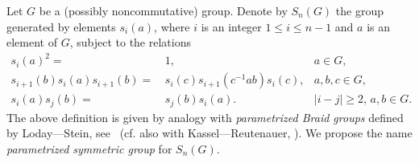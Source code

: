 \documentclass[oneside, 10pt]{amsart}
\makeatletter
\theoremstyle{plain}
\numberwithin{equation}{section}
\numberwithin{lemma}{section}
\theoremstyle{remark}
\theoremstyle{definition}
\newcommand{\pullbackcorner}[1][dr]{\save*!/#1-1.2pc/#1:(-1,1)@^{|-}\restore}
\makeatother
\begin{document}
\begin{comment}
Denote by $D_n(G)$ the subgroup of $G^n$ consisting of vectors
 $(g_1,\ldots, g_n)$ for which the product $g_1\cdot \ldots \cdot g_n$ lies in the derived subgroup $[G, G]$.
Recall from Rehmann's paper~\cite{Reh78} that the universal {\it extension of type $\mathfrak{H}_n$} (denoted $H_n(G)$) 
 is, by definition, a certain (central) extension of $D_n(G)$ explicitly presented by generators and relations 
 (see section~\ref{sec:Hnextensions} below).
The extension $H_n(G)$ and its ''antisymmetrization`` $H^\wedge_n(G)$ can be characterised by the property that 
 they fit into the following pullback squares:
\[ \xymatrix{ G \mathbin{\widetilde{\wedge}} G \pullbackcorner \ar@{^{(}->}[d] \ar@{->>}[r] & [G, G] \ar@{^{(}->}[d]^{\iota_1} \\ H_n(G) \ar@{->>}[r] & D_n(G)} \qquad
   \xymatrix{ G \wedge G \pullbackcorner \ar@{^{(}->}[d] \ar@{->>}[r] & [G, G] \ar@{^{(}->}[d]^{\iota_1} \\ H^\wedge_n(G) \ar@{->>}[r] & D_n(G)} \]
Here $G \wedge G$ denotes the nonabelian exterior square of $G$ and  
 $G \mathbin{\widetilde{\wedge}} G$ is the modern notation for the Dennis group $(G, G)$ defined in~\cite{De76} (also denoted $U_G$ by Rehmann in \cite{Reh78}).
The map $\iota_1$ in the above diagrams is defined by $\iota_1(g) = (g, 1,\ldots, 1)$.
\end{comment}
Let $G$ be a (possibly noncommutative) group. Denote by $S_n(G)$ the group generated by elements $s_i(a)$, where $i$ is an integer $1\leq i\leq n-1$ and $a$ is an element of $G$, subject to the relations
\begin{align}
s_i(a)^2 = &\, 1,                                    & a \in G, \label{S1} \tag{SnG1} \\
s_{i+1}(b) s_i(a) s_{i+1}(b) = &\, s_i(c) s_{i+1}(c^{-1}ab) s_i(c),& a, b, c \in G, \label{S2} \tag{SnG2} \\
s_i(a) s_j(b) = &\, s_j(b) s_i(a) .                             & |i-j|\geq 2,\, a, b\in G. \label{S3} \tag{SnG3}
\end{align}
The above definition is given by analogy with {\it parametrized Braid groups} defined by Loday---Stein, see~\cite{LS05} (cf. also with Kassel---Reutenauer, \cite{KR98}).
We propose the name {\it parametrized symmetric group} for $S_n(G)$.

\begin{comment}
Denote by $F$ the free product of copies of the symmetric group $S_n$ in which each copy is indexed by an $n$-tuple $(g_1, \ldots, g_n) \in G^n$.
Denote by $S_n(G)$ the quotient of $F$ modulo relations of the form $s_{(g)}$ = $s_{(h)}$ in which $g, h \in G^n$ and $s\in S_n$ are such that in the wreath product $G \wr S_n = G^n \rtimes S_n$ the equality $s^g = s^h$ holds
 (here $s_{g}$ and $s_{h}$ denote images of $s \in S_n$ under respective embeddings $S_n\to F$).
It is not hard to check that there is a well defined map $\mu_n \colon S_n(G)\to G \wr S_n$ given by $s_{(g)} \mapsto s^g$.
\end{comment}
\end{document}
